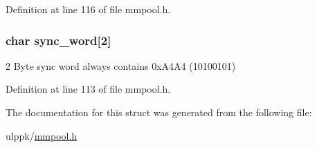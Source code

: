 Definition at line 116 of file mmpool.\-h.

\hypertarget{struct__bpcf__buffer_a3eba3ce7c4d0575db2fdc15293233b18}{
\subsubsection[{sync\-\_\-word}]{\setlength{\rightskip}{0pt plus 5cm}char sync\-\_\-word\mbox{[}2\mbox{]}}}\label{struct__bpcf__buffer_a3eba3ce7c4d0575db2fdc15293233b18}


2 Byte sync word always contains 0x\-A4\-A4 (10100101) 



Definition at line 113 of file mmpool.\-h.



The documentation for this struct was generated from the following file\-:\begin{DoxyCompactItemize}
\item 
ulppk/\hyperlink{mmpool_8h}{mmpool.\-h}\end{DoxyCompactItemize}
